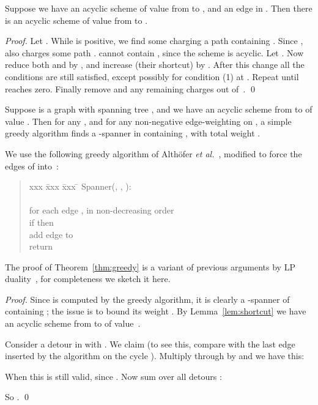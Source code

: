 \documentclass{llncs}
\begin{document}
\begin{lemma}\label{lem:shortcut} 
Suppose we have an acyclic scheme of value  from  to , and
an edge  in .  Then there is an acyclic scheme of value 
from  to .
\end{lemma}

\begin{proof}
Let .  While  is positive, we find some  charging
a path  containing .  Since ,  also charges some path .  
cannot contain , since the scheme is acyclic.  Let
.  Now reduce both
 and  by , and increase
 (their shortcut) by .  After this change all the
conditions are still satisfied, except possibly for condition (1) at .
Repeat until  reaches zero.  Finally remove  and any
remaining charges out of~.  \qed
\end{proof}

\begin{theorem}
\label{thm:greedy}
Suppose  is a graph with spanning tree , and we have an acyclic
scheme from  to  of value .  Then for any , and
for any non-negative edge-weighting  on , a simple greedy
algorithm finds a -spanner  in  containing ,
with total weight .
\end{theorem}
We use the following greedy algorithm of Alth\"{o}fer 
\emph{et al.}~\cite{Althofer:1993:SSW:156252.156258},
modified to force the edges of  into~:
\begin{quote}
\begin{tabbing}
xxx \= xxx \= xxx \= \kill
Spanner(, , ): \\
\>  \\
\> for each edge , in non-decreasing  order \\
\>\> if  then \\
\>\>\> add edge  to \\
\>return 
\end{tabbing}
\end{quote}
The proof of Theorem~\ref{thm:greedy} is a variant of previous 
arguments by LP duality~\cite
{Grigni:2000:ATG:646253.686316,Grigni:2002:LSA:545381.545492},
for completeness we sketch it here.
\begin{proof}
Since  is computed by the greedy algorithm, it is clearly a
-spanner of  containing ; the issue is to bound
its weight .  
By Lemma~\ref{lem:shortcut} we have an acyclic scheme from  to
 of value~.  

Consider a detour  in  with . We claim  (to see this, compare 
with the last edge inserted by the algorithm on the cycle ). 
Multiply through by  and we have this:

When  this is still valid, since .  Now sum over all
detours :

So .
\qed
\end{proof}
\end{document}
